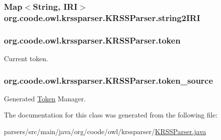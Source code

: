 \hypertarget{classorg_1_1coode_1_1owl_1_1krssparser_1_1_k_r_s_s_parser_a255c8d697a241c4d074bf8fde8e69520}{
\subsubsection[{string2\-I\-R\-I}]{\setlength{\rightskip}{0pt plus 5cm}Map$<$String, {\bf I\-R\-I}$>$ org.\-coode.\-owl.\-krssparser.\-K\-R\-S\-S\-Parser.\-string2\-I\-R\-I\hspace{0.3cm}{\ttfamily [private]}}}\label{classorg_1_1coode_1_1owl_1_1krssparser_1_1_k_r_s_s_parser_a255c8d697a241c4d074bf8fde8e69520}
\hypertarget{classorg_1_1coode_1_1owl_1_1krssparser_1_1_k_r_s_s_parser_ac312336ca2bb938dc41074fc3cdff390}{
\subsubsection[{token}]{ org.\-coode.\-owl.\-krssparser.\-K\-R\-S\-S\-Parser.\-token}}\label{classorg_1_1coode_1_1owl_1_1krssparser_1_1_k_r_s_s_parser_ac312336ca2bb938dc41074fc3cdff390}
Current token. \hypertarget{classorg_1_1coode_1_1owl_1_1krssparser_1_1_k_r_s_s_parser_a56f34282d0ce3a01bf4804da9bdd8773}{
\subsubsection[{token\-\_\-source}]{ org.\-coode.\-owl.\-krssparser.\-K\-R\-S\-S\-Parser.\-token\-\_\-source}}\label{classorg_1_1coode_1_1owl_1_1krssparser_1_1_k_r_s_s_parser_a56f34282d0ce3a01bf4804da9bdd8773}
Generated \hyperlink{classorg_1_1coode_1_1owl_1_1krssparser_1_1_token}{Token} Manager. 

The documentation for this class was generated from the following file\-:\begin{DoxyCompactItemize}
\item 
parsers/src/main/java/org/coode/owl/krssparser/\hyperlink{_k_r_s_s_parser_8java}{K\-R\-S\-S\-Parser.\-java}\end{DoxyCompactItemize}
